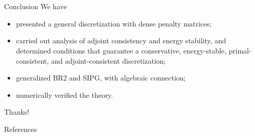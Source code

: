\documentclass{beamer}
\begin{document}
\section*{}
\begin{frame}{Conclusion}
      We have
      \begin{itemize}
          \item presented a general discretization with dense penalty matrices;
          \item carried out analysis of adjoint consistency and energy stability, and
          determined conditions that guarantee a conservative, energy-stable,
          primal-consistent, and adjoint-consistent discretization;
          \item generalized BR2 and SIPG, with algebraic connection;
          \item numerically verified the theory.
      \end{itemize}
\end{frame}

\begin{frame}
    \Huge\centering
    Thanks!
\end{frame}

\begin{frame}[allowframebreaks]{References}
    \footnotesize
    
    
\end{frame}
\end{document}
